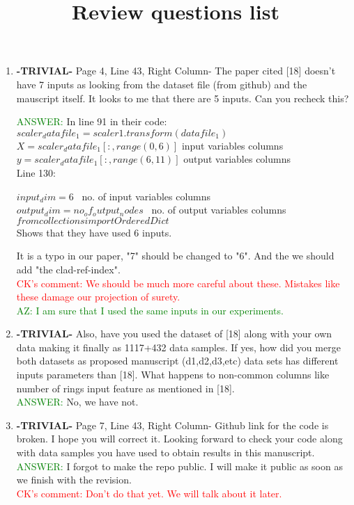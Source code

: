 \documentclass{article}
\title{Review questions list}
\begin{document}
\begin{enumerate}
	\item \textbf{-TRIVIAL-} Page 4, Line 43, Right Column- The paper cited [18] doesn't have 7 inputs as looking from the dataset file (from github) and the mauscript itself. It looks to me that there are 5 inputs. Can you recheck this?

\textcolor{green}{ANSWER: } In line 91 in their code: \\
$ scaler_datafile_1 = scaler1.transform(datafile_1) $  \\
 $X = scaler_datafile_1[:,range(0,6)]$                 input variables columns\\
$y = scaler_datafile_1[:,range(6,11)] $                  output variables columns\\    

Line 130:

$ input_dim = 6   $                                   \ no. of input variables columns\\
$ output_dim = no_of_output_nodes $                     \ no. of output variables columns\\
$from collections import OrderedDict $  \\

Shows that they have used 6 inputs.

It is a typo in our paper, "7" should be changed to "6". And the we should add "the clad-ref-index".	\\
\textcolor{red}{ CK's comment: We should be much more careful about these. Mistakes like these damage our projection of surety.}\\

\textcolor{green}{ AZ: I am sure that I used the same inputs in our experiments.}
	
	\item \textbf{-TRIVIAL-} Also, have you used the dataset of [18] along with your own data making it finally as 1117+432 data samples. If yes, how did you merge both datasets as proposed manuscript (d1,d2,d3,etc) data sets has different inputs parameters than [18]. What happens to non-common columns like number of rings input feature as mentioned in [18].     \\
	\textcolor{green}{ANSWER: } No, we have not. 
		
		
\item \textbf{-TRIVIAL-} Page 7, Line 43, Right Column- Github link for the code is broken. I hope you will correct it. Looking forward to check your code along with data samples you have used  to obtain results in this manuscript. \\
\textcolor{green}{ANSWER: } I forgot to make the repo public. I will make it public as soon as we finish with the revision. \\ 
\textcolor{red}{ CK's comment: Don't do that yet. We will talk about it later.}
    

\end{enumerate}
\end{document}
